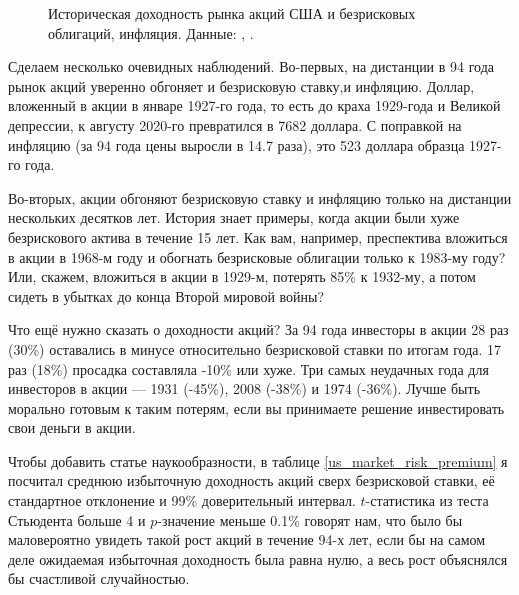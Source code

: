 \begin{figure}[h]
\caption{Историческая доходность рынка акций США и безрисковых облигаций, инфляция. Данные: \cite{kennethFrench}, \cite{fredCpiu}.}
\label{us_market_premium_figure}
\end{figure}

Сделаем несколько очевидных наблюдений. Во-первых, на дистанции в 94 года рынок акций уверенно обгоняет и безрисковую ставку,и инфляцию. Доллар, вложенный в акции в январе 1927-го года, то есть до краха 1929-года и Великой депрессии, к августу 2020-го превратился в 7682 доллара. С поправкой на инфляцию (за 94 года цены выросли в 14.7 раза), это 523 доллара образца 1927-го года.

Во-вторых, акции обгоняют безрисковую ставку и инфляцию только на дистанции нескольких десятков лет. История знает примеры, когда акции были хуже безрискового актива в течение 15 лет. Как вам, например, преспектива вложиться в акции в 1968-м году и обогнать безрисковые облигации только к 1983-му году? Или, скажем, вложиться в акции в 1929-м, потерять 85\% к 1932-му, а потом сидеть в убытках до конца Второй мировой войны?

Что ещё нужно сказать о доходности акций? За 94 года инвесторы в акции 28 раз (30\%) оставались в минусе относительно безрисковой ставки по итогам года. 17 раз (18\%) просадка составляла -10\% или хуже. Три самых неудачных года для инвесторов в акции --- 1931 (-45\%), 2008 (-38\%) и 1974 (-36\%). Лучше быть морально готовым к таким потерям, если вы принимаете решение инвестировать свои деньги в акции.

Чтобы добавить статье наукообразности, в таблице \ref{us_market_risk_premium} я посчитал среднюю избыточную доходность акций сверх безрисковой ставки, её стандартное отклонение и 99\% доверительный интервал. $t$-статистика из теста Стьюдента больше 4 и $p$-значение меньше 0.1\% говорят нам, что было бы маловероятно увидеть такой рост акций в течение 94-х лет, если бы на самом деле ожидаемая избыточная доходность была равна нулю, а весь рост объяснялся бы счастливой случайностью.


